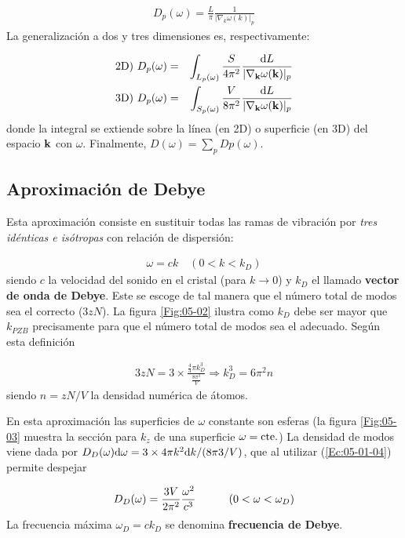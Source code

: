 \begin{eqnarray}
	D_p (\omega)  = \frac{L}{\pi} \frac{1}{|\nabla_ k \omega (k)|_p }
\end{eqnarray}
La generalización a dos y tres dimensiones es, respectivamente:

\begin{eqnarray}
	\text{2D}) \  D_p (\omega) &=& \int_{L_p (\omega)} \frac{S}{4\pi^2} \frac{\mathrm{d} L}{|\nabla_{\mathbf{k}} \omega(\mathbf{k})|_p} \\ 
	\text{3D}) \  D_p (\omega) &=& \int_{S_p (\omega)} \frac{V}{8\pi^2} \frac{\mathrm{d} L}{|\nabla_{\mathbf{k}} \omega(\mathbf{k})|_p} \label{Ec:05-01-04}
\end{eqnarray}
donde la integral se extiende sobre la línea (en 2D) o superficie (en 3D) del espacio $\mathbf{k}$ con $\omega$. Finalmente, $D(\omega)=\sum_p Dp (\omega)$.
 
\subsection{Aproximación de Debye}

Esta aproximación consiste en sustituir todas las ramas de vibración por \textit{tres idénticas e isótropas} con relación de dispersión:

\begin{eqnarray}
	\omega = c k \quad (0<k<k_D)
\end{eqnarray}
siendo $c$ la velocidad del sonido en el cristal (para $k\rightarrow 0$) y $k_D$ el llamado \textbf{vector de onda de Debye}. Este se escoge de tal manera que el número total de modos sea el correcto ($3zN$). La figura \ref{Fig:05-02} ilustra como $k_D$ debe ser mayor que $k_{PZB}$ precisamente para que el número total de modos sea el adecuado. Según esta definición

\begin{eqnarray}
	3zN = 3 \times \frac{\frac{4}{3} \pi k^3_D}{\frac{8 \pi^3}{V}} \Rightarrow k_D^3 = 6 \pi^2 n
\end{eqnarray}
siendo $n=zN/V$ la densidad numérica de átomos. 

En esta aproximación las superficies de $\omega$ constante son esferas (la figura \ref{Fig:05-03} muestra la sección para $k_z$ de una superficie $\omega=\text{cte}.$) La densidad de modos viene dada por $D_D(\omega) \mathrm{d} \omega = 3 \times 4 \pi k^2 \mathrm{d} k / (8\pi3 /V)$, que al utilizar (\ref{Ec:05-01-04}) permite despejar 

\begin{eqnarray}
	D_D (\omega) = \frac{3V}{2\pi^2} \frac{\omega^2}{c^3} \quad \quad \quad (0<\omega<\omega_D)
\end{eqnarray}
La frecuencia máxima $\omega_D=ck_D$ se denomina \textbf{frecuencia de Debye}.

